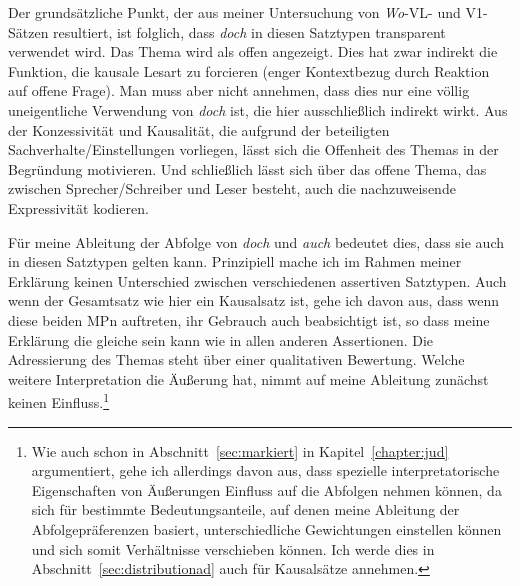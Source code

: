 {Der grundsätzliche Punkt, der aus meiner Untersuchung von \textit{Wo}-VL- und V1-Sätzen resultiert, ist folglich, dass \textit{doch} in diesen Satztypen transparent verwendet wird. Das Thema wird als offen angezeigt. Dies hat zwar indirekt die Funktion, die kausale Lesart zu forcieren (enger Kontextbezug durch Reaktion auf offene Frage). Man muss aber nicht annehmen, dass dies nur eine völlig uneigentliche Verwendung von \textit{doch} ist, die hier ausschließlich indirekt wirkt. Aus der Konzessivität und Kausalität, die aufgrund der beteiligten Sachverhalte/Ein\-stellungen vorliegen, lässt sich die Offenheit des Themas in der Begründung motivieren. Und schließlich lässt sich über das offene Thema, das zwischen Sprecher/Schreiber und Leser besteht, auch die nachzuweisende Expressivität kodieren.

Für meine Ableitung der Abfolge von \textit{doch} und \textit{auch} bedeutet dies, dass sie auch in diesen Satztypen gelten kann. Prinzipiell mache ich im Rahmen meiner Erklärung keinen Unterschied zwischen verschiedenen assertiven Satztypen. Auch wenn der Gesamtsatz wie hier ein Kausalsatz ist, gehe ich davon aus, dass wenn diese beiden MPn auftreten, ihr Gebrauch auch beabsichtigt ist, so dass meine Erklärung die gleiche sein kann wie in allen anderen Assertionen. Die Adressierung des Themas steht über einer qualitativen Bewertung. Welche weitere Interpretation die Äußerung hat, nimmt auf meine Ableitung zunächst keinen Einfluss.\footnote{Wie auch schon in Abschnitt~\ref{sec:markiert} in Kapitel~\ref{chapter:jud} argumentiert, gehe ich allerdings davon aus, dass spezielle interpretatorische Eigenschaften von Äußerungen Einfluss auf die Abfolgen nehmen können, da sich für bestimmte Bedeutungsanteile, auf denen meine Ableitung der Abfolgepräferenzen basiert, unterschiedliche Gewichtungen einstellen können und sich somit Verhältnisse verschieben können. Ich werde dies in Abschnitt~\ref{sec:distributionad} auch für Kausalsätze annehmen.}

}
